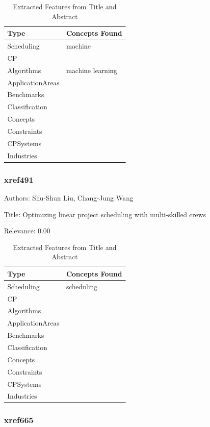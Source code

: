 {\scriptsize
\begin{longtable}{p{2cm}p{20cm}}
\caption{Extracted Features from Title and Abstract}\\ \toprule
Type & Concepts Found\\ \midrule
\endhead
\bottomrule
\endfoot
Scheduling & machine\\ 
CP & \\ 
Algorithms & machine learning\\ 
ApplicationAreas & \\ 
Benchmarks & \\ 
Classification & \\ 
Concepts & \\ 
Constraints & \\ 
CPSystems & \\ 
Industries & \\ 
\end{longtable}
}



\subsubsection{xref491}
\label{mw:xref491}

Authors: Shu-Shun Liu, Chang-Jung Wang

Title: Optimizing linear project scheduling with multi-skilled crews

Relevance:  0.00

{\scriptsize
\begin{longtable}{p{2cm}p{20cm}}
\caption{Extracted Features from Title and Abstract}\\ \toprule
Type & Concepts Found\\ \midrule
\endhead
\bottomrule
\endfoot
Scheduling & scheduling\\ 
CP & \\ 
Algorithms & \\ 
ApplicationAreas & \\ 
Benchmarks & \\ 
Classification & \\ 
Concepts & \\ 
Constraints & \\ 
CPSystems & \\ 
Industries & \\ 
\end{longtable}
}



\subsubsection{xref665}
\label{mw:xref665}

